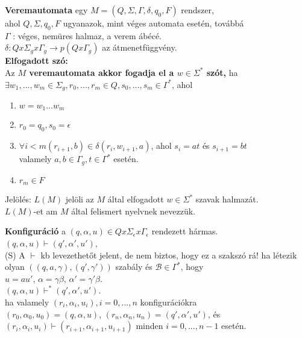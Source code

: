 \begin{frame}
\begin{tcolorbox}[title={Def.: Veremautomata, Elfgadott szó}]
\textbf{Veremautomata} egy $M = (Q, {\Sigma}, {\Gamma}, {\delta}, q_0, F)$ rendszer,\\
ahol $Q, {\Sigma}, q_0, F$ ugyanazok, mint véges automata esetén, továbbá\\
\mmedskip
$\Gamma$ : véges, nemüres halmaz, a verem ábécé.\\
$\delta : Q x {\Sigma}_g x {\Gamma}_g \rightarrow p(Q x {\Gamma}_g)$ az átmenetfüggvény.\\
\mbigskip
\textbf{Elfogadott szó:}\\
Az \textbf{$M$ veremautomata akkor fogadja el a $w \in {\Sigma}^*$ szót,} ha\\
${\exists}w_1, ..., w_m \in {\Sigma}_g, r_0, ..., r_m \in Q, s_0, ..., s_m \in {\Gamma}^*$, ahol\\
\begin{enumerate}
\item $w = w_1...w_m$\\
\item $r_0 = q_0, s_0 = \epsilon$
\item ${\forall}i < m (r_{i + 1}, b) \in {\delta}(r_i, w_{i + 1}, a)$, ahol $s_i = at$ és $s_{i + 1} = bt$\\
valamely $a, b \in {\Gamma}_g, t \in {\Gamma}^*$ esetén.
\item $r_m \in F$
\end{enumerate}
\mmedskip
Jelölés: $L(M)$ jelöli az $M$ által elfogadott $w \in {\Sigma}^*$ szavak halmazát.\\
$L(M)$-et am $M$ által felismert nyelvnek nevezzük.
\end{tcolorbox}
\end{frame}

\begin{frame}
\begin{tcolorbox}[title={Def.: Konfiguráció}]
\textbf{Konfiguráció} a $(q, {\alpha}, u) \in Q x {\Sigma}_{\epsilon} x {\Gamma}_{\epsilon}$ rendezett hármas.\\
\mmedskip
$(q, {\alpha}, u) \vdash (q', {\alpha}', u')$,\\
{\tiny (S) A $\vdash$ kb levezethetőt jelent, de nem biztos, hogy ez a szakszó rá!}
\mmedskip
ha létezik olyan $((q, a, {\gamma}), (q', {\gamma}'))$ szabály és $\mathcal{B} \in {\Gamma}^*$, hogy\\
\mmedskip
$u = au'$, $\alpha = {\gamma}{\beta}$, ${\alpha}' = {\gamma}'{\beta}$.\\
\mmedskip
$(q, {\alpha}, u) {\vdash}^* (q', {\alpha}', u')$.\\
\mmedskip
ha valamely $(r_i, {\alpha}_i, u_i), i = 0, ..., n$ konfigurációkra\\
\mmedskip
$(r_0, {\alpha}_0, u_0) = (q, {\alpha}, u)$, $(r_n, {\alpha}_n, u_n) = (q', {\alpha}', u')$, és\\
$(r_i, {\alpha}_i, u_i) \vdash (r_{i + 1}, {\alpha}_{i + 1}, u_{i + 1})$ minden $i = 0, ..., n - 1$ esetén.\\
\end{tcolorbox}
\end{frame}

